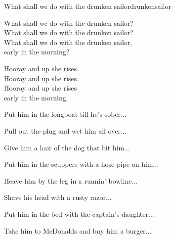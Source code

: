 \begin{song}{What shall we do with the drunken sailor}{drunkensailor}
\begin{vers}
What shall we do with the drunken sailor?\\
What shall we do with the drunken sailor?\\
What shall we do with the drunken sailor,\\
early in the morning?\\
\end{vers}
\begin{vers}
Hooray and up she rises.\\
Hooray and up she rises.\\
Hooray and up she rises\\
early in the morning.\\
\end{vers}
\begin{vers}
Put him in the longboat till he's sober...\\
\end{vers}
\begin{vers}
Pull out the plug and wet him all over...\\
\end{vers}
\begin{vers}
Give him a hair of the dog that bit him...\\
\end{vers}
\begin{vers}
Put him in the scuppers with a hose-pipe on him...\\
\end{vers}
\begin{vers}
Heave him by the leg in a runnin' bowline...\\
\end{vers}
\begin{vers}
Shave his head with a rusty razor...\\
\end{vers}
\begin{vers}
Put him in the bed with the captain's daughter...\\
\end{vers}
\begin{vers}
Take him to McDonalds and buy him a burger...\\
\end{vers}
\end{song}

\newpage

